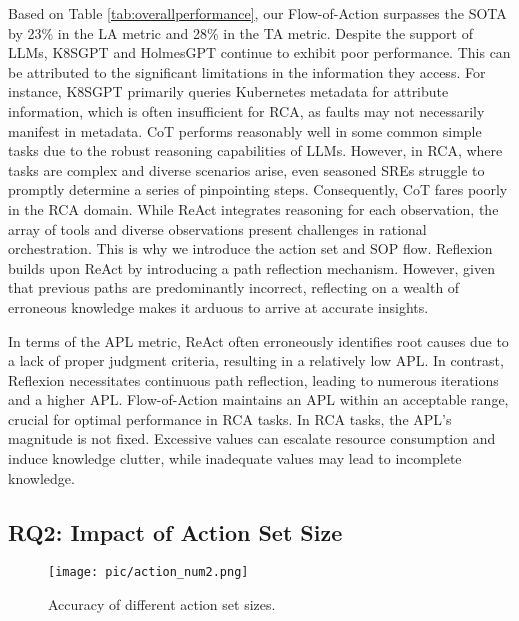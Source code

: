 Based on Table \ref{tab:overallperformance}, our Flow-of-Action surpasses the SOTA by 23\% in the LA metric and 28\% in the TA metric. Despite the support of LLMs, K8SGPT and HolmesGPT continue to exhibit poor performance. This can be attributed to the significant limitations in the information they access. For instance, K8SGPT primarily queries Kubernetes metadata for attribute information, which is often insufficient for RCA, as faults may not necessarily manifest in metadata. CoT performs reasonably well in some common simple tasks due to the robust reasoning capabilities of LLMs. However, in RCA, where tasks are complex and diverse scenarios arise, even seasoned SREs struggle to promptly determine a series of pinpointing steps. Consequently, CoT fares poorly in the RCA domain. While ReAct integrates reasoning for each observation, the array of tools and diverse observations present challenges in rational orchestration. This is why we introduce the action set and SOP flow. Reflexion builds upon ReAct by introducing a path reflection mechanism. However, given that previous paths are predominantly incorrect, reflecting on a wealth of erroneous knowledge makes it arduous to arrive at accurate insights.

In terms of the APL metric, ReAct often erroneously identifies root causes due to a lack of proper judgment criteria, resulting in a relatively low APL. In contrast, Reflexion necessitates continuous path reflection, leading to numerous iterations and a higher APL. Flow-of-Action maintains an APL within an acceptable range, crucial for optimal performance in RCA tasks. In RCA tasks, the APL's magnitude is not fixed. Excessive values can escalate resource consumption and induce knowledge clutter, while inadequate values may lead to incomplete knowledge.



\subsection{RQ2: Impact of Action Set Size}



\begin{figure}[htbp]
\centerline{\texttt{[image: pic/action\_num2.png]}}
\caption{Accuracy of different action set sizes.}
\label{actionsetsize}
\end{figure}

